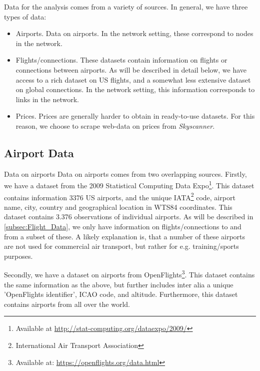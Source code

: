 \label{sec:data}
Data for the analysis comes from a variety of sources.
In general, we have three types of data:
\begin{itemize}
    \item Airports. Data on airports. In the network setting, these correspond to nodes in the network.
    \item Flights/connections. These datasets contain information on flights or connections between airports. As will be described in detail below, we have access to a rich dataset on US flights, and a somewhat less extensive dataset on global connections. In the network setting, this information corresponds to links in the network.
    \item Prices. Prices are generally harder to obtain in ready-to-use datasets. For this reason, we choose to scrape web-data on prices from \textit{Skyscanner}.
\end{itemize}

\subsection{Airport Data}
Data on airports 
Data on airports comes from two overlapping sources. Firstly, we have a dataset from the 2009 Statistical Computing Data Expo\footnote{Available at \url{http://stat-computing.org/dataexpo/2009/}}. This dataset contains information 3376 US airports, and the unique IATA\footnote{International Air Transport Association} code, airport name, city, country and geographical location in WTS84 coordinates. This dataset contains 3.376 observations of individual airports. As will be described in \ref{subsec:Flight_Data}, we only have information on flights/connections to and from a subset of these. A likely explanation is, that a number of these airports are not used for commercial air transport, but rather for e.g. training/sports purposes.\par
Secondly, we have a dataset on airports from OpenFlights\footnote{Available at: \url{https://openflights.org/data.html}}. This dataset contains the same information as the above, but further includes inter alia a unique 'OpenFlights identifier', ICAO code, and altitude. Furthermore, this dataset contains airports from all over the world.

